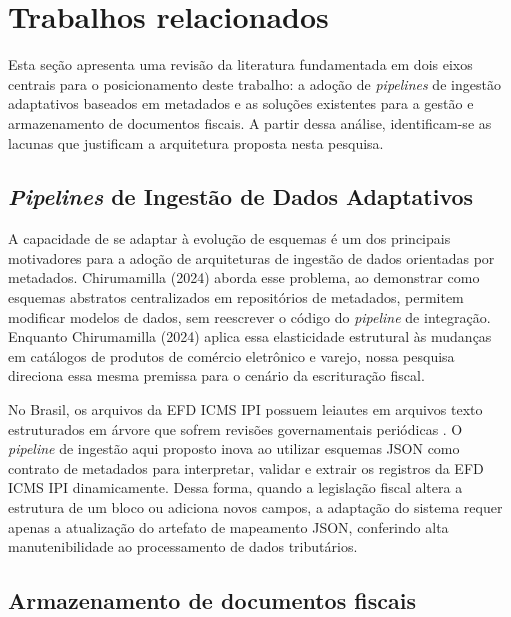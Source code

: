 \section{Trabalhos relacionados}

Esta seção apresenta uma revisão da literatura fundamentada em dois eixos
centrais para o posicionamento deste trabalho: a adoção de \textit{pipelines}
de ingestão adaptativos baseados em metadados e as soluções existentes para a
gestão e armazenamento de documentos fiscais. A partir dessa análise,
identificam-se as lacunas que justificam a
arquitetura proposta nesta pesquisa.

\subsection{\textit{Pipelines} de Ingestão de Dados Adaptativos}
\label{sec:pipelines_adaptativos}

A capacidade de se adaptar à evolução de esquemas é um dos principais
motivadores para a adoção de arquiteturas de ingestão de dados orientadas por
metadados. Chirumamilla (2024) aborda esse problema, ao
demonstrar como esquemas abstratos centralizados em repositórios de metadados,
permitem modificar modelos de dados, sem reescrever o código do
\textit{pipeline} de integração. Enquanto Chirumamilla (2024) aplica essa
elasticidade estrutural às mudanças em catálogos de produtos de comércio
eletrônico e varejo, nossa pesquisa direciona essa mesma premissa para o
cenário da escrituração fiscal.

No Brasil, os arquivos da EFD ICMS IPI possuem leiautes em arquivos texto
estruturados em árvore que sofrem revisões governamentais periódicas
\cite{nota_tecnica_efd}. O \textit{pipeline} de ingestão aqui proposto inova
ao utilizar esquemas JSON como contrato de metadados para interpretar, validar e
extrair os registros da EFD ICMS IPI dinamicamente. Dessa forma, quando a
legislação fiscal altera a estrutura de um bloco ou adiciona novos campos, a
adaptação do sistema requer apenas a atualização do artefato de mapeamento JSON,
conferindo alta manutenibilidade ao processamento de dados tributários.

\subsection{Armazenamento de documentos fiscais}
\label{sec:armazenamento_docs_fiscais}

